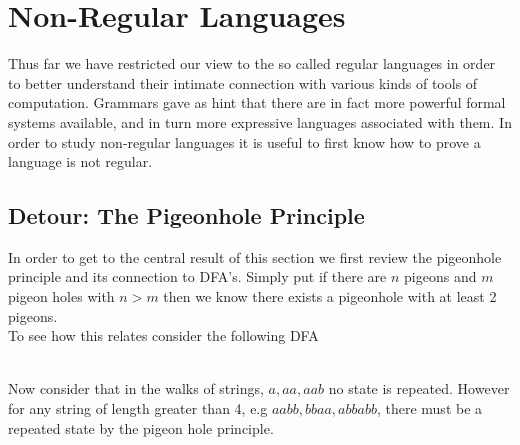 \documentclass[11pt]{exam}
\begin{document}
\newpage

\section{Non-Regular Languages}

Thus far we have restricted our view to the so called regular languages in order to better understand their intimate connection with various kinds of  tools of computation. Grammars gave as hint that there are in fact more powerful formal systems available, and in turn more expressive languages associated with them. In order to study non-regular languages it is useful to first know how to prove a language is not regular.

\subsection{Detour: The Pigeonhole Principle}

In order to get to the central result of this section we first review the pigeonhole principle and its connection to DFA's. Simply put if there are $n$ pigeons and $m$ pigeon holes with $n > m$ then we know there exists a pigeonhole with at least 2 pigeons.\\

To see how this relates consider the following DFA\\
\\
Now consider that in the walks of strings, $a,aa,aab$ no state is repeated. However for any string of length greater than 4, e.g $aabb, bbaa, abbabb$,  there must be a repeated state by the pigeon hole principle. 
\end{document}
